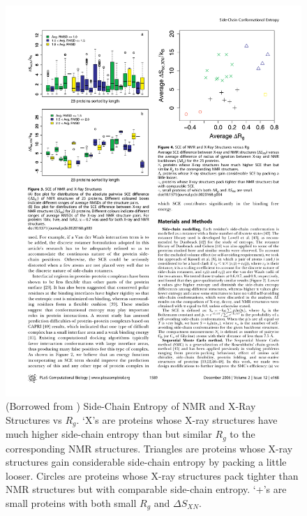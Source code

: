\begin{figure}[h]
	\center
	\includegraphics{deltaS_descrimination}
	\caption{(Borrowed from \cite{Zhang:2006p11}) Side-Chain Entropy of NMR and X-Ray Structures vs $R_g$. `X's are proteins whose X-ray structures have much higher side-chain entropy than but similar $R_g$ to the corresponding NMR structures. Triangles are proteins whose X-ray structures gain considerable side-chain entropy by packing a little looser. Circles are proteins whose X-ray structures pack tighter than NMR structures but with comparable side-chain entropy. `+'s are small proteins with both small $R_g$ and $\Delta S_{XN}$.}
	\label{fig:deltaS_descrimination}
\end{figure}